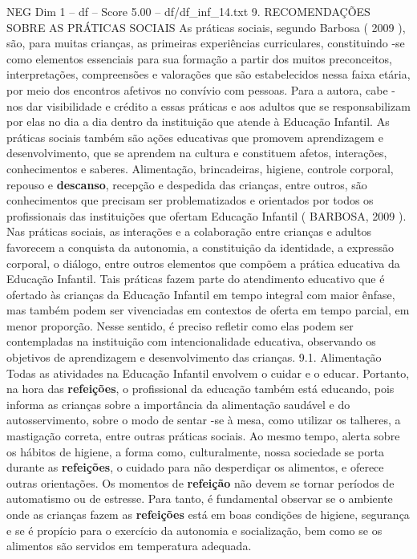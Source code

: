 \begin{textsample}{NEG Dim 1 – df – Score 5.00 – df/df\_inf\_14.txt}  \label{ex:f1_neg_168}
9.
RECOMENDAÇÕES SOBRE AS PRÁTICAS SOCIAIS As práticas sociais, segundo Barbosa ( 2009 ), são, para muitas crianças, as primeiras experiências curriculares, constituindo -se como elementos essenciais para sua formação a partir dos muitos preconceitos, interpretações, compreensões e valorações que são estabelecidos nessa faixa etária, por meio dos encontros afetivos no convívio com pessoas.
Para a autora, cabe -nos dar visibilidade e crédito a essas práticas e aos adultos que se responsabilizam por elas no dia a dia dentro da instituição que atende à Educação Infantil.
As práticas sociais também são ações educativas que promovem aprendizagem e desenvolvimento, que se aprendem na cultura e constituem afetos, interações, conhecimentos e saberes.
Alimentação, brincadeiras, higiene, controle corporal, repouso e \textbf{descanso}, recepção e despedida das crianças, entre outros, são conhecimentos que precisam ser problematizados e orientados por todos os profissionais das instituições que ofertam Educação Infantil ( BARBOSA, 2009 ).
Nas práticas sociais, as interações e a colaboração entre crianças e adultos favorecem a conquista da autonomia, a constituição da identidade, a expressão corporal, o diálogo, entre outros elementos que compõem a prática educativa da Educação Infantil.
Tais práticas fazem parte do atendimento educativo que é ofertado às crianças da Educação Infantil em tempo integral com maior ênfase, mas também podem ser vivenciadas em contextos de oferta em tempo parcial, em menor proporção.
Nesse sentido, é preciso refletir como elas podem ser contempladas na instituição com intencionalidade educativa, observando os objetivos de aprendizagem e desenvolvimento das crianças. 9.1.
Alimentação Todas as atividades na Educação Infantil envolvem o cuidar e o educar.
Portanto, na hora das \textbf{refeições}, o profissional da educação também está educando, pois informa as crianças sobre a importância da alimentação saudável e do autosservimento, sobre o modo de sentar -se à mesa, como utilizar os talheres, a mastigação correta, entre outras práticas sociais.
Ao mesmo tempo, alerta sobre os hábitos de higiene, a forma como, culturalmente, nossa sociedade se porta durante as \textbf{refeições}, o cuidado para não desperdiçar os alimentos, e oferece outras orientações.
Os momentos de \textbf{refeição} não devem se tornar períodos de automatismo ou de estresse.
Para tanto, é fundamental observar se o ambiente onde as crianças fazem as \textbf{refeições} está em boas condições de higiene, segurança e se é propício para o exercício da autonomia e socialização, bem como se os alimentos são servidos em temperatura adequada.

\end{textsample}
